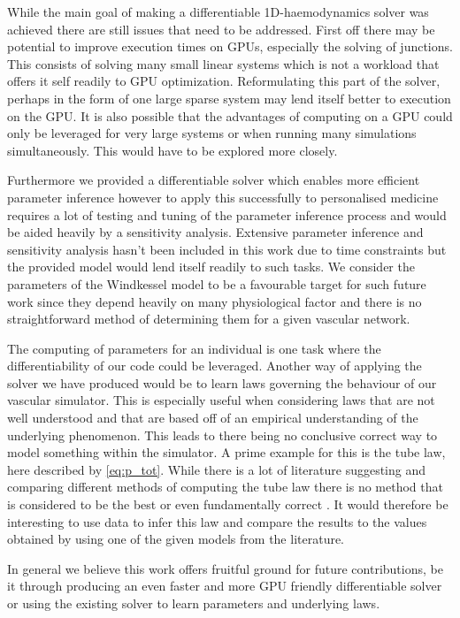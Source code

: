 \documentclass[a4paper, oneside]{discothesis}
\begin{document}
While the main goal of making a differentiable 1D-haemodynamics solver was achieved there are still issues that need to be addressed.
First off there may be potential to improve execution times on GPUs, especially the solving of junctions. 
This consists of solving many small linear systems which is not a workload that offers it self readily to GPU optimization.
Reformulating this part of the solver, perhaps in the form of one large sparse system may lend itself better to execution on the GPU.
It is also possible that the advantages of computing on a GPU could only be leveraged for very large systems or when running many simulations simultaneously.
This would have to be explored more closely.

Furthermore we provided a differentiable solver which enables more efficient parameter inference however to apply this successfully to personalised medicine requires a lot of testing and tuning of the parameter inference process and would be aided heavily by a sensitivity analysis.
Extensive parameter inference and sensitivity analysis hasn't been included in this work due to time constraints but the provided model would lend itself readily to such tasks.
We consider the parameters of the Windkessel model to be a favourable target for such future work since they depend heavily on many physiological factor and there is no straightforward method of determining them for a given vascular network.

The computing of parameters for an individual is one task where the differentiability of our code could be leveraged.
Another way of applying the solver we have produced would be to learn laws governing the behaviour of our vascular simulator.
This is especially useful when considering laws that are not well understood and that are based off of an empirical understanding of the underlying phenomenon.
This leads to there being no conclusive correct way to model something within the simulator.
A prime example for this is the tube law, here described by \autoref{eq:p_tot}.
While there is a lot of literature suggesting and comparing different methods of computing the tube law there is no method that is considered to be the best or even fundamentally correct \cite{gomez2017analysis}.
It would therefore be interesting to use data to infer this law and compare the results to the values obtained by using one of the given models from the literature.

In general we believe this work offers fruitful ground for future contributions, be it through producing an even faster and more GPU friendly differentiable solver or using the existing solver to learn parameters and underlying laws.
\end{document}
